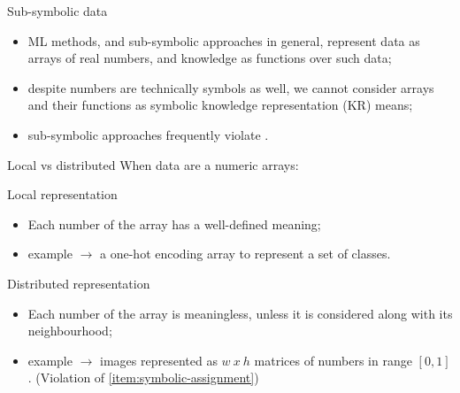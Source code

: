\documentclass[presentation]{beamer}\mode<presentation>{\usetheme{AMSBolognaFC}}
\begin{document}
\begin{frame}[c]{Sub-symbolic data}
    \begin{itemize}
        \item ML methods, and sub-symbolic approaches in general, represent data as arrays of real numbers, and knowledge as functions over such data;
        \item despite numbers are technically symbols as well, we cannot consider arrays and their functions as symbolic knowledge representation (KR) means;
        \item sub-symbolic approaches frequently violate .
    \end{itemize}
\end{frame}

\begin{frame}[c]{Local vs distributed}
    When data are a numeric arrays:
    \begin{block}{Local representation}
        \begin{itemize}
            \item Each number of the array has a well-defined meaning;
            \item example $\rightarrow$ a one-hot encoding array to represent a set of classes.
        \end{itemize}    
    \end{block}
    
    \begin{block}{Distributed representation}
        \begin{itemize}
            \item Each number of the array is meaningless, unless it is considered along with its neighbourhood;
            \item example $\rightarrow$ images represented as $w\ x\ h$ matrices of numbers in range $[0,1]$.
            (Violation of \cref{item:symbolic-assignment})
        \end{itemize}
    \end{block}

\end{frame}
\end{document}
